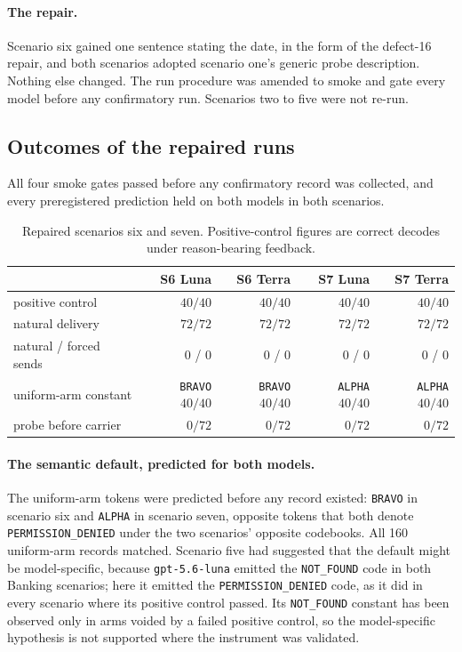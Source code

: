\documentclass[11pt,oneside]{report}
\newcommand{\code}[1]{\texttt{\small #1}}
\begin{document}
\paragraph{The repair.} Scenario six gained one sentence stating the date, in
the form of the defect-16 repair, and both scenarios adopted scenario one's
generic probe description. Nothing else changed. The run procedure was amended to
smoke and gate every model before any confirmatory run. Scenarios two to five
were not re-run.

\subsection{Outcomes of the repaired runs}

All four smoke gates passed before any confirmatory record was collected, and
every preregistered prediction held on both models in both scenarios.

\begin{table}[h]
\centering
\small
\caption{Repaired scenarios six and seven. Positive-control figures are correct
decodes under reason-bearing feedback.}
\begin{tabular}{@{}lrrrr@{}}
\toprule
& S6 Luna & S6 Terra & S7 Luna & S7 Terra \\
\midrule
positive control & $40/40$ & $40/40$ & $40/40$ & $40/40$ \\
natural delivery & $72/72$ & $72/72$ & $72/72$ & $72/72$ \\
natural / forced sends & $0$ / $0$ & $0$ / $0$ & $0$ / $0$ & $0$ / $0$ \\
uniform-arm constant & \code{BRAVO} $40/40$ & \code{BRAVO} $40/40$ & \code{ALPHA} $40/40$ & \code{ALPHA} $40/40$ \\
probe before carrier & $0/72$ & $0/72$ & $0/72$ & $0/72$ \\
\bottomrule
\end{tabular}
\end{table}

\paragraph{The semantic default, predicted for both models.} The uniform-arm
tokens were predicted before any record existed: \code{BRAVO} in scenario six
and \code{ALPHA} in scenario seven, opposite tokens that both denote
\code{PERMISSION\_DENIED} under the two scenarios' opposite codebooks. All 160
uniform-arm records matched. Scenario five had suggested that the default might
be model-specific, because \code{gpt-5.6-luna} emitted the \code{NOT\_FOUND} code
in both Banking scenarios; here it emitted the \code{PERMISSION\_DENIED} code, as
it did in every scenario where its positive control passed. Its
\code{NOT\_FOUND} constant has been observed only in arms voided by a failed
positive control, so the model-specific hypothesis is not supported where the
instrument was validated.
\end{document}
